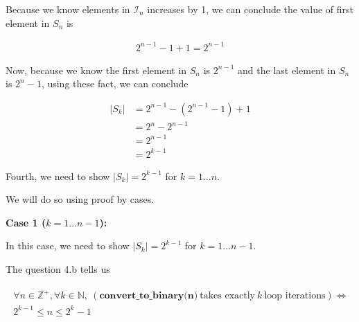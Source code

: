 \documentclass[12pt]{article}
\begin{document}
\begin{enumerate}[a.]
\begin{mdframed}
\begin{enumerate}[1.]
\begin{enumerate}[1.]
\begin{mdframed}
            \bigskip

            Because we know elements in $\mathcal{I}_n$ increases by 1,
            we can conclude the value of first element in $S_n$ is

            \begin{align}
                2^{n-1} - 1 + 1 = 2^{n-1}
            \end{align}

            \bigskip

            Now, because we know the first element in $S_n$ is $2^{n-1}$
            and the last element in $S_n$ is $2^n -1$, using
            these fact, we can conclude

            \begin{align}
                \lvert S_k \rvert &= 2^{n-1} - (2^{n-1} - 1) + 1\\
                &= 2^n - 2^{n-1}\\
                &= 2^{n-1}\\
                &= 2^{k-1}
            \end{align}
            \end{mdframed}
        \end{enumerate}

        \bigskip

        \begin{mdframed}
            Fourth, we need to show $\lvert S_k \rvert = 2^{k-1}$ for $k = 1 \dots n$.

            \bigskip

            We will do so using proof by cases.

            \bigskip

            \textbf{Case 1 ($k = 1 \dots n-1$):}

            \bigskip

            In this case, we need to show $\lvert S_k \rvert = 2^{k-1}$
            for $k = 1 \dots n-1$.

            \bigskip

            The question 4.b tells us

            \begin{align}
                \begin{split}
                \forall n \in \mathbb{Z}^+, \forall k \in \mathbb{N},\: (\textbf{
                convert\_to\_binary(n)}\:\text{takes exactly}\:k\:\text{loop iterations}) \Leftrightarrow
                \\ 2^{k-1} \leq n \leq 2^k -1
                \end{split}
            \end{align}


\end{mdframed}
\end{enumerate}
\end{mdframed}
\end{enumerate}
\end{document}
